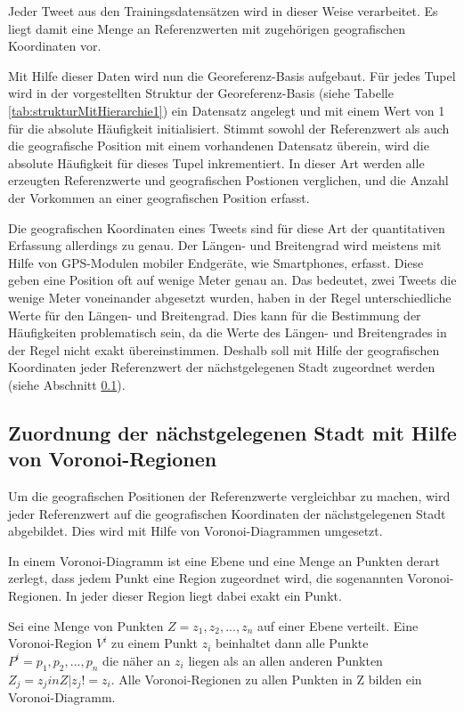 			Jeder Tweet aus den Trainingsdatensätzen wird in dieser Weise verarbeitet. 
			Es liegt damit eine Menge an Referenzwerten mit zugehörigen geografischen Koordinaten vor.

			Mit Hilfe dieser Daten wird nun die Georeferenz-Basis aufgebaut. 
			Für jedes Tupel wird in der vorgestellten Struktur der Georeferenz-Basis (siehe Tabelle \ref{tab:strukturMitHierarchie1}) ein Datensatz angelegt und mit einem Wert von 1 für die absolute Häufigkeit initialisiert. 
			Stimmt sowohl der Referenzwert als auch die geografische Position mit einem vorhandenen Datensatz überein, wird die absolute Häufigkeit für dieses Tupel inkrementiert.
			In dieser Art werden alle erzeugten Referenzwerte und geografischen Postionen verglichen, und die Anzahl der Vorkommen an einer geografischen Position erfasst.

			Die geografischen Koordinaten eines Tweets sind für diese Art der quantitativen Erfassung allerdings zu genau. 
			Der Längen- und Breitengrad wird meistens mit Hilfe von GPS-Modulen mobiler Endgeräte, wie Smartphones, erfasst.
			Diese geben eine Position oft auf wenige Meter genau an.
			Das bedeutet, zwei Tweets die wenige Meter voneinander abgesetzt wurden, haben in der Regel unterschiedliche Werte für den Längen- und Breitengrad.
			Dies kann für die Bestimmung der Häufigkeiten problematisch sein, da die Werte des Längen- und Breitengrades in der Regel nicht exakt übereinstimmen.
			Deshalb soll mit Hilfe der geografischen Koordinaten jeder Referenzwert der nächstgelegenen Stadt zugeordnet werden (siehe Abschnitt \ref{sub:Stadtbestimmen}).

		\subsection{Zuordnung der nächstgelegenen Stadt mit Hilfe von Voronoi-Regionen} \label{sub:Stadtbestimmen} 

			Um die geografischen Positionen der Referenzwerte vergleichbar zu machen, wird jeder Referenzwert auf die geografischen Koordinaten der nächstgelegenen Stadt abgebildet.
			Dies wird mit Hilfe von Voronoi-Diagrammen umgesetzt.

			In einem Voronoi-Diagramm ist eine Ebene und eine Menge an Punkten derart zerlegt, dass jedem Punkt eine Region zugeordnet wird, die sogenannten Voronoi-Regionen.
			In jeder dieser Region liegt dabei exakt ein Punkt.  

			Sei eine Menge von Punkten $Z = {z_1,z_2,...,z_n}$ auf einer Ebene verteilt.
			Eine Voronoi-Region $V^i$ zu einem Punkt $z_i$ beinhaltet dann alle Punkte $P^i={p_1,p_2,...,p_n}$ die näher an $z_i$ liegen als an allen anderen Punkten $Z_j={z_j in Z|z_j!=z_i}$.
			Alle Voronoi-Regionen zu allen Punkten in Z bilden ein Voronoi-Diagramm.

